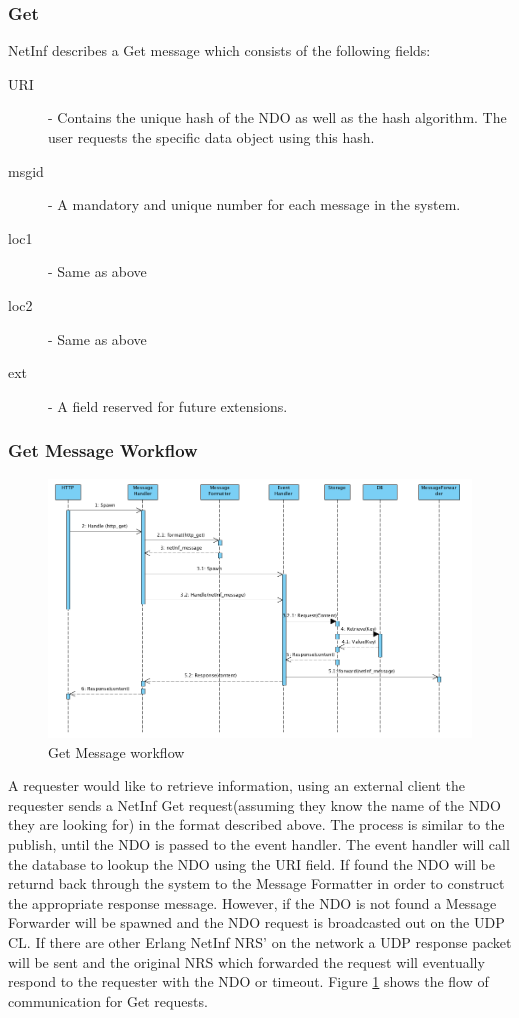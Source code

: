 \subsubsection{Get}

NetInf describes a Get message which consists of the following fields:

\begin{description}
\item[URI] - Contains the unique hash of the NDO as well as the hash algorithm. The user requests the specific data object using this hash.
\item[msgid]- A mandatory and unique number for each message in the system.
\item[loc1] - Same as above
\item[loc2] - Same as above
\item[ext]  - A field reserved for future extensions.
\end{description}

\subsubsection{Get Message Workflow}

\begin{figure}[H]
	\centering
\centerline{\includegraphics[width=1.2\textwidth]{./img/backend_seq_diagram_GET.png}}
\caption{Get Message workflow}
\label{fig:getfig}
\end{figure}

A requester would like to retrieve information, using an external client the requester sends a NetInf Get request(assuming they know the name of the NDO they are looking for) in the format described above. The process is similar to the publish, until the NDO is passed to the event handler. The event handler will call the database to lookup the NDO using the URI field. If found the NDO will be returnd back through the system to the Message Formatter in order to construct the appropriate response message. However, if the NDO is not found a Message Forwarder will be spawned and the NDO request is broadcasted out on the UDP CL. If there are other Erlang NetInf NRS' on the network a UDP response packet will be sent and the original NRS which forwarded the request will eventually respond to the requester with the NDO or timeout. Figure \ref{fig:getfig} shows the flow of communication for Get requests.


